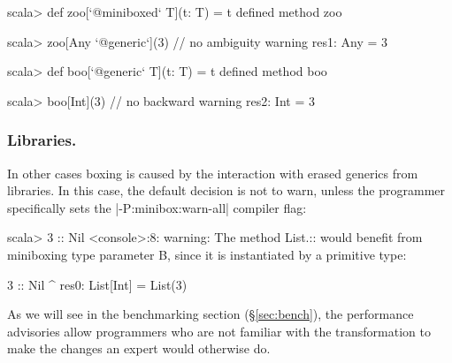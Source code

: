 \begin{lstlisting-nobreak}
 scala> def zoo[`@miniboxed` T](t: T) = t
 defined method zoo

 scala> zoo[Any `@generic`](3) // no ambiguity warning
 res1: Any = 3

 scala> def boo[`@generic` T](t: T) = t
 defined method boo

 scala> boo[Int](3)                   // no backward warning
 res2: Int = 3
\end{lstlisting-nobreak}


\subsubsection{Libraries.} In other cases boxing is caused by the interaction with erased generics from libraries. In this case, the default decision is not to warn, unless the programmer specifically sets the |-P:minibox:warn-all| compiler flag:

\begin{lstlisting-nobreak}
 scala> 3 :: Nil
 <console>:8: warning: The method List.:: would benefit from miniboxing type parameter B, since it is instantiated by a primitive type:

               3 :: Nil
                 ^
 res0: List[Int] = List(3)
\end{lstlisting-nobreak}

As we will see in the benchmarking section (\S\ref{sec:bench}), the performance advisories allow programmers who are not familiar with the transformation to make the changes an expert would otherwise do.

